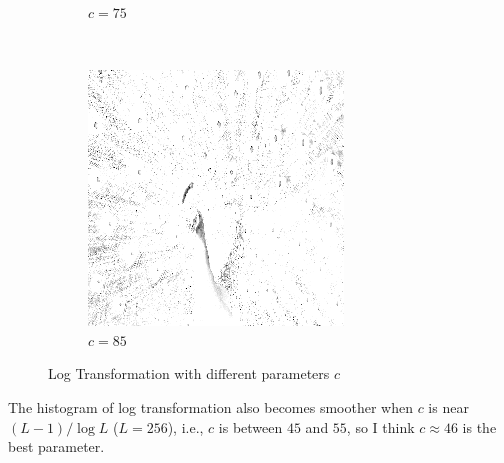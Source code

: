 \documentclass{article}
\begin{document}
\begin{enumerate}[label=(\alph*)]
\begin{figure}[!htb]
\begin{subfigure}[b]{0.3\textwidth}
            \caption{$c = 75$}
        \end{subfigure}
        ~
        \begin{subfigure}[b]{0.3\textwidth}
            \includegraphics[width=\textwidth]{img/LT85.png}
            \caption{$c = 85$}
        \end{subfigure}
        \caption{Log Transformation with different parameters $c$}
        \label{Log Transformation with different parameters $c$}        
    \end{figure}    
    
    \newpage
    The histogram of log transformation also becomes smoother when $c$ is near $(L - 1) / \log L$ ($L = 256$), i.e., $c$ is between $45$ and $55$, so I think $c \approx 46$ is the best parameter.
    

\end{enumerate}
\end{document}
